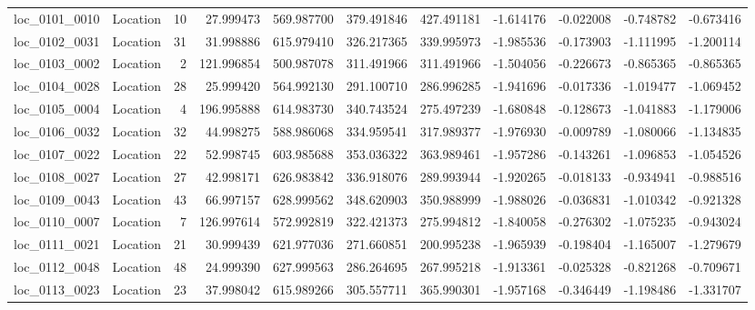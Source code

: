 \begin{tabular}{llrrrrrrrrr}
loc_0101_0010 &        Location &              10 &  27.999473 & 569.987700 &  379.491846 &    427.491181 &  -1.614176 &  -0.022008 &   -0.748782 &     -0.673416 \\
loc_0102_0031 &        Location &              31 &  31.998886 & 615.979410 &  326.217365 &    339.995973 &  -1.985536 &  -0.173903 &   -1.111995 &     -1.200114 \\
loc_0103_0002 &        Location &               2 & 121.996854 & 500.987078 &  311.491966 &    311.491966 &  -1.504056 &  -0.226673 &   -0.865365 &     -0.865365 \\
loc_0104_0028 &        Location &              28 &  25.999420 & 564.992130 &  291.100710 &    286.996285 &  -1.941696 &  -0.017336 &   -1.019477 &     -1.069452 \\
loc_0105_0004 &        Location &               4 & 196.995888 & 614.983730 &  340.743524 &    275.497239 &  -1.680848 &  -0.128673 &   -1.041883 &     -1.179006 \\
loc_0106_0032 &        Location &              32 &  44.998275 & 588.986068 &  334.959541 &    317.989377 &  -1.976930 &  -0.009789 &   -1.080066 &     -1.134835 \\
loc_0107_0022 &        Location &              22 &  52.998745 & 603.985688 &  353.036322 &    363.989461 &  -1.957286 &  -0.143261 &   -1.096853 &     -1.054526 \\
loc_0108_0027 &        Location &              27 &  42.998171 & 626.983842 &  336.918076 &    289.993944 &  -1.920265 &  -0.018133 &   -0.934941 &     -0.988516 \\
loc_0109_0043 &        Location &              43 &  66.997157 & 628.999562 &  348.620903 &    350.988999 &  -1.988026 &  -0.036831 &   -1.010342 &     -0.921328 \\
loc_0110_0007 &        Location &               7 & 126.997614 & 572.992819 &  322.421373 &    275.994812 &  -1.840058 &  -0.276302 &   -1.075235 &     -0.943024 \\
loc_0111_0021 &        Location &              21 &  30.999439 & 621.977036 &  271.660851 &    200.995238 &  -1.965939 &  -0.198404 &   -1.165007 &     -1.279679 \\
loc_0112_0048 &        Location &              48 &  24.999390 & 627.999563 &  286.264695 &    267.995218 &  -1.913361 &  -0.025328 &   -0.821268 &     -0.709671 \\
loc_0113_0023 &        Location &              23 &  37.998042 & 615.989266 &  305.557711 &    365.990301 &  -1.957168 &  -0.346449 &   -1.198486 &     -1.331707 \\

\end{tabular}
